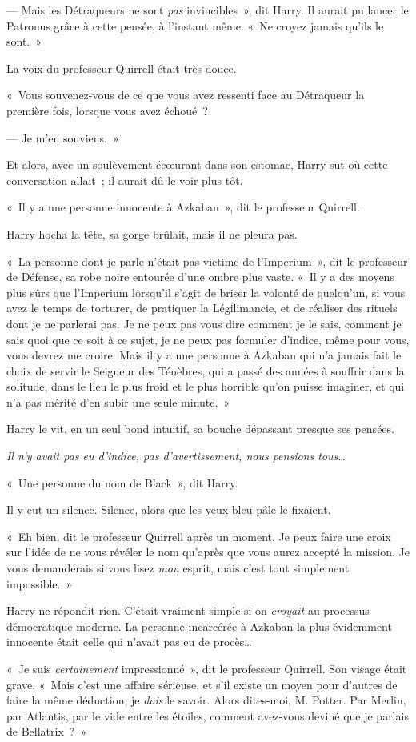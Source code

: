 --- Mais les Détraqueurs ne sont \emph{pas} invincibles~», dit Harry. Il aurait pu lancer le Patronus grâce à cette pensée, à l'instant même. «~Ne croyez jamais qu'ils le sont.~»

La voix du professeur Quirrell était très douce.

«~Vous souvenez-vous de ce que vous avez ressenti face au Détraqueur la première fois, lorsque vous avez échoué~?

--- Je m'en souviens.~»

Et alors, avec un soulèvement écœurant dans son estomac, Harry sut où cette conversation allait~; il aurait dû le voir plus tôt.

«~Il y a une personne innocente à Azkaban~», dit le professeur Quirrell.

Harry hocha la tête, sa gorge brûlait, mais il ne pleura pas.

«~La personne dont je parle n'était pas victime de l'Imperium~», dit le professeur de Défense, sa robe noire entourée d'une ombre plus vaste. «~Il y a des moyens plus sûrs que l'Imperium lorsqu'il s'agit de briser la volonté de quelqu'un, si vous avez le temps de torturer, de pratiquer la Légilimancie, et de réaliser des rituels dont je ne parlerai pas. Je ne peux pas vous dire comment je le sais, comment je sais quoi que ce soit à ce sujet, je ne peux pas formuler d'indice, même pour vous, vous devrez me croire. Mais il y a une personne à Azkaban qui n'a jamais fait le choix de servir le Seigneur des Ténèbres, qui a passé des années à souffrir dans la solitude, dans le lieu le plus froid et le plus horrible qu'on puisse imaginer, et qui n'a pas mérité d'en subir une seule minute.~»

Harry le vit, en un seul bond intuitif, sa bouche dépassant presque ses pensées.

\emph{Il n'y avait pas eu d'indice, pas d'avertissement, nous pensions tous…}

«~Une personne du nom de Black~», dit Harry.

Il y eut un silence. Silence, alors que les yeux bleu pâle le fixaient.

«~Eh bien, dit le professeur Quirrell après un moment. Je peux faire une croix sur l'idée de ne vous révéler le nom qu'après que vous aurez accepté la mission. Je vous demanderais si vous lisez \emph{mon} esprit, mais c'est tout simplement impossible.~»

Harry ne répondit rien. C'était vraiment simple si on \emph{croyait} au processus démocratique moderne. La personne incarcérée à Azkaban la plus évidemment innocente était celle qui n'avait pas eu de procès…

«~Je suis \emph{certainement} impressionné~», dit le professeur Quirrell. Son visage était grave. «~Mais c'est une affaire sérieuse, et s'il existe un moyen pour d'autres de faire la même déduction, je \emph{dois} le savoir. Alors dites-moi, M. Potter. Par Merlin, par Atlantis, par le vide entre les étoiles, comment avez-vous deviné que je parlais de Bellatrix~?~»
